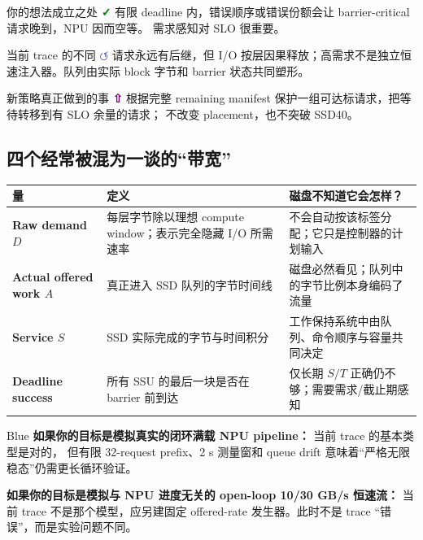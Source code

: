 \documentclass[UTF8,fontset=none,10pt,a4paper]{ctexart}
\begin{document}
\begin{minipage}[t]{.32\textwidth}
\begin{kpicard}{你的想法成立之处}
\textcolor{Green}{\Large\bfseries ✓}\quad
有限 deadline 内，错误顺序或错误份额会让 barrier-critical 请求晚到，NPU 因而空等。
需求感知对 SLO 很重要。
\end{kpicard}
\end{minipage}\hfill
\begin{minipage}[t]{.32\textwidth}
\begin{kpicard}{当前 trace 的不同}
\textcolor{Blue}{\Large\bfseries $\circlearrowleft$}\quad
请求永远有后继，但 I/O 按层因果释放；高需求不是独立恒速注入器。队列由实际 block
字节和 barrier 状态共同塑形。
\end{kpicard}
\end{minipage}\hfill
\begin{minipage}[t]{.32\textwidth}
\begin{kpicard}{新策略真正做到的事}
\textcolor{Purple}{\Large\bfseries ⇧}\quad
根据完整 remaining manifest 保护一组可达标请求，把等待转移到有 SLO 余量的请求；
不改变 placement，也不突破 SSD40。
\end{kpicard}
\end{minipage}

\subsection{四个经常被混为一谈的“带宽”}

\begin{tabularx}{\textwidth}{>{\bfseries\sffamily}p{28mm} Y Y}
\toprule
量 & 定义 & 磁盘不知道它会怎样？\\
\midrule
Raw demand $D$ & 每层字节除以理想 compute window；表示完全隐藏 I/O 所需速率 & 不会自动按该标签分配；它只是控制器的计划输入\\
Actual offered work $A$ & 真正进入 SSD 队列的字节时间线 & 磁盘必然看见；队列中的字节比例本身编码了流量\\
Service $S$ & SSD 实际完成的字节与时间积分 & 工作保持系统中由队列、命令顺序与容量共同决定\\
Deadline success & 所有 SSU 的最后一块是否在 barrier 前到达 & 仅长期 $S/T$ 正确仍不够；需要需求/截止期感知\\
\bottomrule
\end{tabularx}

\begin{insightbox}[title={最终判断}]{Blue}
\textbf{如果你的目标是模拟真实的闭环满载 NPU pipeline：} 当前 trace 的基本类型是对的，
但有限 32-request prefix、2 s 测量窗和 queue drift 意味着“严格无限稳态”仍需更长循环验证。\par
\textbf{如果你的目标是模拟与 NPU 进度无关的 open-loop 10/30 GB/s 恒速流：}
当前 trace 不是那个模型，应另建固定 offered-rate 发生器。此时不是 trace “错误”，而是实验问题不同。
\end{insightbox}
\end{document}

